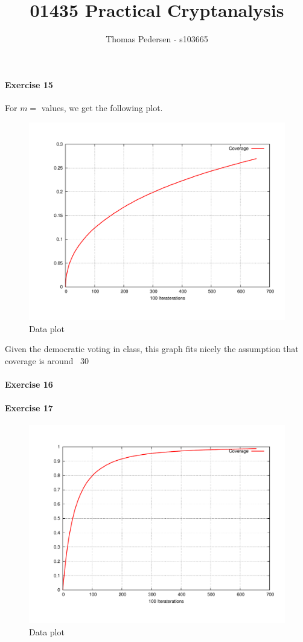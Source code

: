 \documentclass[10pt,a4paper]{article}
\title{01435 Practical Cryptanalysis}
\author{Thomas Pedersen - s103665}
\begin{document}
\maketitle

\paragraph*{Exercise 15} For $m = $ values, we get the following plot.
\begin{figure}[h]
\centering
\includegraphics[scale=0.4]{../output/ex15.pdf}
 \caption{Data plot}
 \label{fig:ex15}
\end{figure}
Given the democratic voting in class, this graph fits nicely the assumption that coverage is around ~30%

\paragraph*{Exercise 16}

\paragraph*{Exercise 17}
\begin{figure}[h]
\centering
\includegraphics[scale=0.4]{../output/ex17.pdf}
 \caption{Data plot}
 \label{fig:ex17}
\end{figure}
\end{document}
